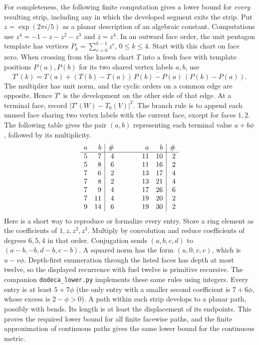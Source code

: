 For completeness, the following finite computation gives a lower bound for
\emph{every} resulting strip, including any in which the developed segment
exits the strip. Put $z=\exp(2\pi i/5)$ as a planar description of an
algebraic constant. Computations use $z^4=-1-z-z^2-z^3$ and $\bar z=z^4$.
In an outward face order, the unit pentagon template has vertices
$P_k=\sum_{r=0}^{k-1}z^r$, $0\leq k\leq4$. Start with this chart on face
zero. When crossing from the known chart $T$ into a fresh face with
template positions $P(a),P(b)$ for its two shared vertex labels $a,b$,
use
\[
 T'(k)=T(a)+(T(b)-T(a))\,\overline{P(b)-P(a)}\,(P(k)-P(a)).
\]
The multiplier has unit norm, and the cyclic orders on a common edge are
opposite. Hence $T'$ is the development on the other side of that edge.
At a terminal face, record $|T'(W)-T_0(V)|^2$. The branch rule is to append
each unused face sharing two vertex labels with the current face, except
for faces $1,2$. The following table gives the pair $(a,b)$ representing
each terminal value $a+b\phi$, followed by its multiplicity.
\[
\begin{array}{rr|r@{\qquad\qquad}rr|r}
a&b&\#&a&b&\#\\ \hline
5&7&4&11&10&2\\
5&8&6&11&16&2\\
7&6&2&13&17&4\\
7&8&2&13&21&4\\
7&9&4&17&26&6\\
7&11&4&19&20&2\\
9&14&6&19&30&2
\end{array}
\]
Here is a short way to reproduce or formalize every entry. Store a
ring element as the coefficients of $1,z,z^2,z^3$. Multiply by convolution
and reduce coefficients of degrees $6,5,4$ in that order. Conjugation
sends $(a,b,c,d)$ to $(a-b,-b,d-b,c-b)$. A squared norm has the form
$(u,0,v,v)$, which is $u-v\phi$. Depth-first enumeration through the listed
faces has depth at most twelve, so the displayed recurrence with fuel
twelve is primitive recursive. The companion
\texttt{dodeca\_lower.py} implements these same rules using integers.
Every entry is at least $5+7\phi$ (the only entry with a smaller second
coefficient is $7+6\phi$, whose excess is $2-\phi>0$). A path within each
strip develops to a planar path, possibly with bends. Its length is at
least the displacement of its endpoints. This proves the required lower
bound for all finite facewise paths, and the finite approximation of
continuous paths gives the same lower bound for the continuous metric.

